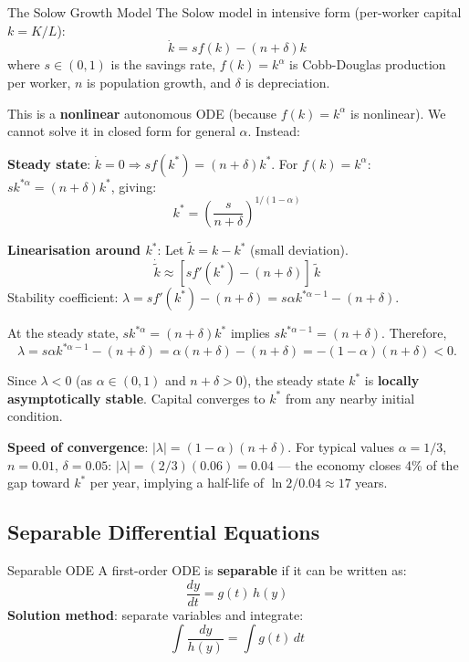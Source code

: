\documentclass[12pt, a4paper]{article}
\theoremstyle{definition}
\newcommand{\dd}[1]{\,d#1}
\begin{document}
\begin{exbox}{The Solow Growth Model}
The Solow model in intensive form (per-worker capital $k = K/L$):
\[
  \dot k = sf(k) - (n+\delta)k
\]
where $s\in(0,1)$ is the savings rate, $f(k)=k^\alpha$ is Cobb-Douglas
production per worker, $n$ is population growth, and $\delta$ is
depreciation.

This is a \textbf{nonlinear} autonomous ODE (because $f(k)=k^\alpha$ is
nonlinear). We cannot solve it in closed form for general $\alpha$. Instead:

\textbf{Steady state}: $\dot k=0 \Rightarrow sf(k^*)=(n+\delta)k^*$.
For $f(k)=k^\alpha$: $sk^{*\alpha} = (n+\delta)k^*$, giving:
\[
  k^* = \left(\frac{s}{n+\delta}\right)^{1/(1-\alpha)}
\]

\textbf{Linearisation around $k^*$}: Let $\tilde k = k - k^*$ (small deviation).
\[
  \dot{\tilde k} \approx [sf'(k^*) - (n+\delta)]\,\tilde k
\]
Stability coefficient: $\lambda = sf'(k^*) - (n+\delta) = s\alpha k^{*\alpha-1} - (n+\delta)$.

At the steady state, $sk^{*\alpha}=(n+\delta)k^*$ implies
$sk^{*\alpha-1}=(n+\delta)$. Therefore,
\[
  \lambda = s\alpha k^{*\alpha-1}-(n+\delta)
  = \alpha(n+\delta)-(n+\delta)
  = -(1-\alpha)(n+\delta) < 0.
\]

Since $\lambda < 0$ (as $\alpha \in(0,1)$ and $n+\delta>0$), the steady
state $k^*$ is \textbf{locally asymptotically stable}. Capital converges to
$k^*$ from any nearby initial condition.

\textbf{Speed of convergence}: $|\lambda| = (1-\alpha)(n+\delta)$.
For typical values $\alpha=1/3$, $n=0.01$, $\delta=0.05$:
$|\lambda| = (2/3)(0.06) = 0.04$ --- the economy closes 4\% of the gap
toward $k^*$ per year, implying a half-life of $\ln 2/0.04 \approx 17$ years.
\end{exbox}

\subsection{Separable Differential Equations}

\begin{defbox}{Separable ODE}
A first-order ODE is \textbf{separable} if it can be written as:
\[
  \frac{dy}{dt} = g(t)\,h(y)
\]
\textbf{Solution method}: separate variables and integrate:
\[
  \int \frac{dy}{h(y)} = \int g(t)\dd{t}
\]
\end{defbox}
\end{document}
